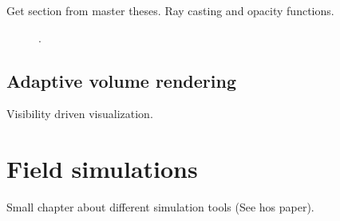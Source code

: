 Get section from master theses. Ray casting and opacity functions.

\begin{figure}
\centering
{}
\caption{.}
\label{fig:vr}
\end{figure}

\subsection{Adaptive volume rendering}

Visibility driven visualization.

\section{Field simulations}

Small chapter about different simulation tools (See hos paper).
			
\endinput
